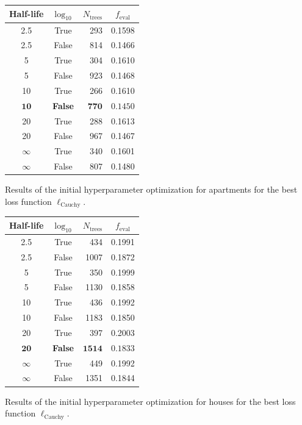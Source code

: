 \begin{margintable}
  \begin{tabular}{@{}ccrc@{}}
    Half-life & $\log_{10}$ & $N_\mathrm{trees}$ & $f_\mathrm{eval}$ \\
    \midrule
    \num{2.5} & True & \num{293} & \num{0.1598} \\
    \num{2.5} & False & \num{814} & \num{0.1466} \\
    \num{5} & True & \num{304} & \num{0.1610} \\
    \num{5} & False & \num{923} & \num{0.1468} \\
    \num{10} & True & \num{266} & \num{0.1610} \\
    $\mathbf{10}$ & \textbf{False} & $\mathbf{770}$ & $\mathbf{0.1450}$ \\
    \num{20} & True & \num{288} & \num{0.1613} \\
    \num{20} & False & \num{967} & \num{0.1467} \\
    $\infty$ & True & \num{340} & \num{0.1601} \\
    $\infty$ & False & \num{807} & \num{0.1480} \\
  \end{tabular}
  \caption{\label{tab:h:HPO_initial_Cauchy-ejerlejlighed}Results of the initial hyperparameter optimization for apartments for the best loss function $\ell_\mathrm{Cauchy}$.}
\end{margintable}


\begin{margintable}
  \begin{tabular}{@{}ccrc@{}}
    Half-life & $\log_{10}$ & $N_\mathrm{trees}$ & $f_\mathrm{eval}$ \\
    \midrule
    \num{2.5} & True & \num{434} & \num{0.1991} \\
    \num{2.5} & False & \num{1007} & \num{0.1872} \\
    \num{5} & True & \num{350} & \num{0.1999} \\
    \num{5} & False & \num{1130} & \num{0.1858} \\
    \num{10} & True & \num{436} & \num{0.1992} \\
    \num{10} & False & \num{1183} & \num{0.1850} \\
    \num{20} & True & \num{397} & \num{0.2003} \\
    $\mathbf{20}$ & \textbf{False} & $\mathbf{1514}$ & $\mathbf{0.1833}$ \\
    $\infty$ & True & \num{449} & \num{0.1992} \\
    $\infty$ & False & \num{1351} & \num{0.1844} \\
  \end{tabular}
  \caption{\label{tab:h:HPO_initial_Cauchy-villa}Results of the initial hyperparameter optimization for houses for the best loss function $\ell_\mathrm{Cauchy}$.}
\end{margintable}


